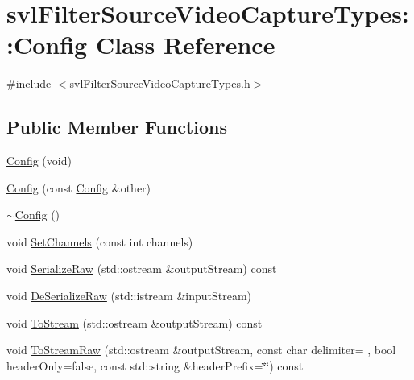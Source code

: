 \hypertarget{classsvl_filter_source_video_capture_types_1_1_config}{}\section{svl\+Filter\+Source\+Video\+Capture\+Types\+:\+:Config Class Reference}
\label{classsvl_filter_source_video_capture_types_1_1_config}


{\ttfamily \#include $<$svl\+Filter\+Source\+Video\+Capture\+Types.\+h$>$}

\subsection*{Public Member Functions}
\begin{DoxyCompactItemize}
\item 
\hyperlink{classsvl_filter_source_video_capture_types_1_1_config_abafb0979741c9620df791e526c078143}{Config} (void)
\item 
\hyperlink{classsvl_filter_source_video_capture_types_1_1_config_a783806d79b3d86ef10166f4610152452}{Config} (const \hyperlink{classsvl_filter_source_video_capture_types_1_1_config}{Config} \&other)
\item 
\hyperlink{classsvl_filter_source_video_capture_types_1_1_config_a238df98b1ac32e0d391ca17235414932}{$\sim$\+Config} ()
\item 
void \hyperlink{classsvl_filter_source_video_capture_types_1_1_config_ad396f74ac4dc5cbf59a0547d33bc410f}{Set\+Channels} (const int channels)
\item 
void \hyperlink{classsvl_filter_source_video_capture_types_1_1_config_a1d19b7f31c60fb8f024d2c111fcaf1fb}{Serialize\+Raw} (std\+::ostream \&output\+Stream) const 
\item 
void \hyperlink{classsvl_filter_source_video_capture_types_1_1_config_a1f882a52486d4b80f23a09aba1911950}{De\+Serialize\+Raw} (std\+::istream \&input\+Stream)
\item 
void \hyperlink{classsvl_filter_source_video_capture_types_1_1_config_a6a5981aa5e9006eb4458b17ede885454}{To\+Stream} (std\+::ostream \&output\+Stream) const 
\item 
void \hyperlink{classsvl_filter_source_video_capture_types_1_1_config_af0211d08de886451c29c0c6243bca5ec}{To\+Stream\+Raw} (std\+::ostream \&output\+Stream, const char delimiter= \textquotesingle{} \textquotesingle{}, bool header\+Only=false, const std\+::string \&header\+Prefix=\char`\"{}\char`\"{}) const 

\end{DoxyCompactItemize}
